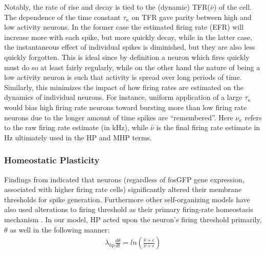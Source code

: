 \documentclass[10pt,letterpaper]{article}
\begin{document}
Notably, the rate of rise and decay is tied to the (dynamic) TFR($\bar{\nu}$) of the cell. The dependence of the time constant $\tau_\kappa$ on TFR gave parity between high and low activity neurons. In the former case the estimated firing rate (EFR) will increase more with each spike, but more quickly decay, while in the latter case, the instantaneous effect of individual spikes is diminished, but they are also less quickly forgotten. This is ideal since by definition a neuron which fires quickly must do so at least fairly regularly, while on the other hand the nature of being a low activity neuron is such that activity is spread over long periods of time. Similarly, this minimizes the impact of how firing rates are estimated on the dynamics of individual neurons. For instance, uniform application of a large $\tau_\kappa$ would bias high firing rate neurons toward bursting more than low firing rate neurons due to the longer amount of time spikes are ``remembered''. Here $\nu_\kappa$ refers to the raw firing rate estimate (in kHz), while $\hat{\nu}$ is the final firing rate estimate in Hz ultimately used in the HP and MHP terms.


\subsubsection*{Homeostatic Plasticity}
\label{sec:HP}
Findings from \cite{barth2004alteration} indicated that neurons (regardless of fosGFP gene expression, associated with higher firing rate cells) significantly altered their membrane thresholds for spike generation. Furthermore other self-organizing models have also used alterations to firing threshold as their primary firing-rate homeostasis mechanism \cite{lazar2009sorn}. In our model, HP acted upon the neuron's firing threshold primarily, $\theta$ as well in the following manner:  	
	 \begin{gather}
	 \lambda_{hp}\frac{d\theta}{dt} = ln\left(\frac{\hat{\nu}+\epsilon}{\bar{\nu} + \epsilon}\right)
	 \end{gather}
\end{document}
